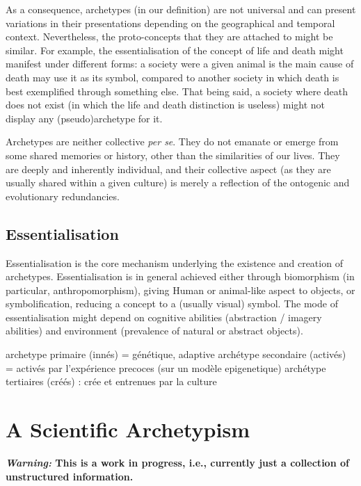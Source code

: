 \documentclass[
]{book}
\begin{document}
As a consequence, archetypes (in our definition) are not universal and can present variations in their presentations depending on the geographical and temporal context. Nevertheless, the proto-concepts that they are attached to might be similar. For example, the essentialisation of the concept of life and death might manifest under different forms: a society were a given animal is the main cause of death may use it as its symbol, compared to another society in which death is best exemplified through something else. That being said, a society where death does not exist (in which the life and death distinction is useless) might not display any (pseudo)archetype for it.

Archetypes are neither collective \emph{per se}. They do not emanate or emerge from some shared memories or history, other than the similarities of our lives. They are deeply and inherently individual, and their collective aspect (as they are usually shared within a given culture) is merely a reflection of the ontogenic and evolutionary redundancies.

\hypertarget{essentialisation}{%
\section{Essentialisation}\label{essentialisation}}

Essentialisation is the core mechanism underlying the existence and creation of archetypes. Essentialisation is in general achieved either through biomorphism (in particular, anthropomorphism), giving Human or animal-like aspect to objects, or symbolification, reducing a concept to a (usually visual) symbol. The mode of essentialisation might depend on cognitive abilities (abstraction / imagery abilities) and environment (prevalence of natural or abstract objects).

archetype primaire (innés) = génétique, adaptive
archétype secondaire (activés) = activés par l'expérience precoces (sur un modèle epigenetique)
archétype tertiaires (créés) : crée et entrenues par la culture

\hypertarget{a-scientific-archetypism}{%
\chapter{A Scientific Archetypism}\label{a-scientific-archetypism}}

\textbf{\emph{Warning:} This is a work in progress, i.e., currently just a collection of unstructured information.}
\end{document}
